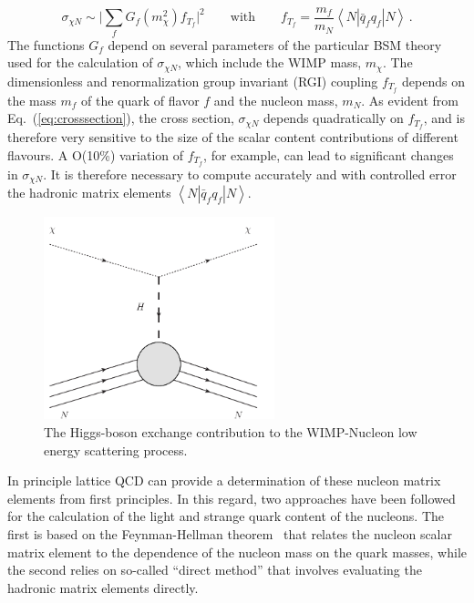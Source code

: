 \documentclass[aps,prc,twocolumn,showpacs,floatfix,nofootinbib,preprintnumbers,superscriptaddress,amsmath,amssymb]{revtex4-1}
\begin{document}
%
\begin{equation}
\sigma_{\chi N} \sim  
\Big\lvert\sum_{f} G_f(m_\chi^2 ) f_{T_f} \Big\rvert^2  \qquad \text{with} \qquad f_{T_f} 
= \frac{m_{f}}{m_N} \left\langle N | \bar{q}_f{q_f} |N \right\rangle \, .
\label{eq:crosssection} 
\end{equation}
%
The functions $G_{f}$ depend on several parameters of 
the particular BSM theory used for the calculation of
$\sigma_{\chi N}$, which include the WIMP mass, $m_\chi$. 
The dimensionless and renormalization group 
invariant (RGI) coupling $f_{T_f}$ depends on the mass $m_{f}$ of the quark 
of flavor $f$ and the nucleon mass, $m_N$.  As evident from Eq.~(\ref{eq:crosssection}), the cross section, $\sigma_{\chi N}$ 
depends quadratically on $f_{T_f}$, and is therefore very sensitive 
to the size of the scalar content contributions of different flavours. A O(10\%) variation
of $f_{T_f}$, for example, can lead to significant changes in $\sigma_{\chi N}$. 
It is therefore necessary to compute accurately and with controlled error 
the hadronic matrix elements $\left\langle N | \bar{q}_fq_f |N \right\rangle$.   

\begin{figure}[tb]
\begin{center}
\includegraphics[width=190pt,angle=0]{Wimp_N_scattering}
\end{center}
\caption{The Higgs-boson exchange contribution to the WIMP-Nucleon low energy 
scattering process.}\label{fig:wimp_N_scatt}
\end{figure}
%

In principle lattice QCD can provide a determination of these nucleon matrix elements from first principles. 
In this regard, two approaches have been followed for the calculation of the 
light and strange quark content 
of the nucleons. The first is based on the 
Feynman-Hellman theorem~\cite{Feynman:1939zz} that relates the nucleon scalar matrix 
element to the dependence of the nucleon mass on the quark masses, while the second relies on so-called ``direct method'' that involves evaluating 
the hadronic matrix elements directly.
\end{document}
